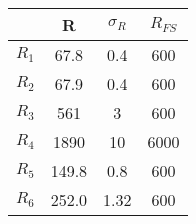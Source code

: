 \begin{center}
\begin{tabulary}{\textwidth}{CCCC}
\toprule
 & R & $\sigma_R$ & $R_{FS}$ \\ \midrule
$R_1$ & 67.8 & 0.4 & 600 \\ \midrule
$R_2$ & 67.9 & 0.4 & 600 \\ \midrule
$R_3$ & 561 & 3 & 600 \\ \midrule
$R_4$ & 1890 & 10 & 6000 \\ \midrule
$R_5$ & 149.8 & 0.8 & 600 \\ \midrule
$R_6$ & 252.0 & 1.32 & 600 \\ 
\bottomrule
\end{tabulary}
\end{center}
